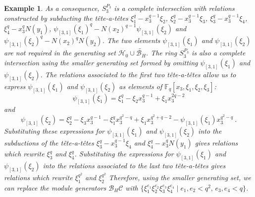 \documentclass{amsart}
\newcommand{\field}{\mathbb{F}}
\newcommand{\HH}{\mathcal{H}}
\newcommand{\BH}{\mathcal{B}_H}
\newcommand{\tat}{t\^ete-a-t\^ete}
\newtheorem{example}[subsection]{Example}
\DeclareMathOperator{\lt}{LT}
\begin{document}
\begin{example}
As a consequence, $S_3^{P_3}$ is a complete intersection with relations constructed by subducting the
\tat s $\xi_1^{q}-x_3^{q-1}\xi_2$,  $\xi_2^{q}-x_3^{q-1}\xi_3$, $\xi_3^q-x_3^{q-1}\xi_4$, $\xi_4^q-x_3^qN(y_1)$, $\psi_{[3,1]}(\xi_1)^q-N(x_2)^{q-1}\psi_{[3,1]}(\xi_2)$
and $\psi_{[3,1]}(\xi_2)^q-N(x_2)^qN(y_2)$.
The two elements $\psi_{[3,1]}(\xi_{1})$ and $\psi_{[3,1]}(\xi_2)$ are
not required in the generating set $\HH_0 \cup \widetilde{\BH}$.
The ring $S_3^{P_3}$ is also a complete intersection using the smaller generating set
formed by omitting $\psi_{[3,1]}(\xi_{1})$ and $\psi_{[3,1]}(\xi_2)$.
The relations associated to the first two \tat s allow us to express 
$\psi_{[3,1]}(\xi_{1})$ and $\psi_{[3,1]}(\xi_2)$ as elements of  
$\field_q[x_3,\xi_1,\xi_2,\xi_3]$:
$$\psi_{[3,1]}(\xi_{1})=\xi_1^q-\xi_2x_3^{q-1}+\xi_1x_3^{2q-2}$$
and
$$\psi_{[3,1]}(\xi_{2})=\xi_2^q-\xi_3 x_3^{q-1}-\xi_1^q x_3^{q^2-q}+\xi_1 x_3^{q^2+q-2}
-\psi_{[3,1]}(\xi_{1}) x_3^{q^2-q}\ .$$
Substituting these
expressions for $\psi_{[3,1]}(\xi_1)$ and $\psi_{[3,1]}(\xi_2)$ into the subductions of the
\tat s $\xi_3^q-x_3^{q-1}\xi_4$ and $\xi_4^q-x_3^qN(y_1)$
gives relations which rewrite $\xi_3^q$ and $\xi_4^q$.
Substituting the expressions for $\psi_{[3,1]}(\xi_{1})$ and $\psi_{[3,1]}(\xi_2)$ 
into the relations associated to the last two \tat s gives relations which rewrite $\xi_1^{q^2}$ and $\xi_2^{q^2}$
Therefore, using the smaller generating set, we can replace the module generators $\BH\mathcal{C}$ with $\{\xi_1^{e_1}\xi_2^{e_2}\xi_3^{e_3}\xi_4^{e_4}\mid e_1,e_2<q^2, \, e_3,e_4<q\}$. 
\end{example}
\end{document}
